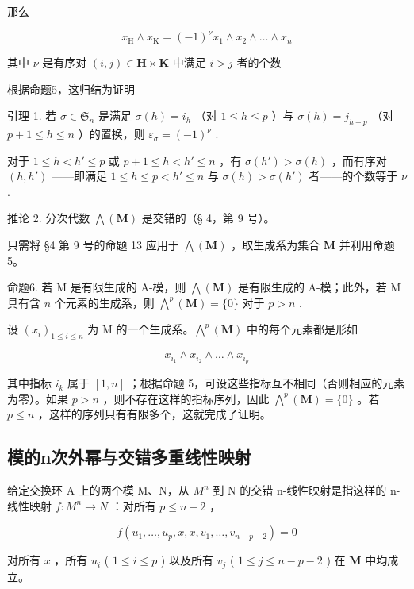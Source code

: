 那么

\[
x _ {\mathrm{H}} \wedge x _ {\mathrm{K}} = (- 1) ^ {\nu} x _ {1} \wedge x _ {2} \wedge \dots \wedge x _ {n}\tag{7}
\]

其中 \(\nu\) 是有序对 \((i,j)\in \mathbf{H}\times \mathbf{K}\) 中满足 \(i > j\) 者的个数

根据命题5，这归结为证明

引理 1. 若 \(\sigma \in \mathfrak{S}_n\) 是满足 \(\sigma(h) = i_h\) （对 \(1 \leqslant h \leqslant p\) ）与 \(\sigma(h) = j_{h-p}\) （对 \(p + 1 \leqslant h \leqslant n\) ）的置换，则 \(\varepsilon_\sigma = (-1)^{\nu}\) .

对于 \(1 \leqslant h < h' \leqslant p\) 或 \(p + 1 \leqslant h < h' \leqslant n\) ，有 \(\sigma(h') > \sigma(h)\) ，而有序对 \((h, h')\) ——即满足 \(1 \leqslant h \leqslant p < h' \leqslant n\) 与 \(\sigma(h) > \sigma(h')\) 者——的个数等于 \(\nu\) .

推论 2. 分次代数 \(\bigwedge (\mathbf{M})\) 是交错的（§ 4，第 9 号）。

只需将 §4 第 9 号的命题 13 应用于 \(\bigwedge (\mathbf{M})\) ，取生成系为集合 \(\mathbf{M}\) 并利用命题5。

命题6. 若 M 是有限生成的 A-模，则 \(\bigwedge (\mathbf{M})\) 是有限生成的 A-模；此外，若 M 具有含 \(n\) 个元素的生成系，则 \(\bigwedge^{p}(\mathbf{M}) = \{0\}\) 对于 \(p > n\) .

设 \((x_{i})_{1\leqslant i\leqslant n}\) 为 M 的一个生成系。\(\bigwedge^{p}(\mathbf{M})\) 中的每个元素都是形如

\[
x _ {i _ {1}} \wedge x _ {i _ {2}} \wedge \dots \wedge x _ {i _ {p}}
\]

其中指标 \(i_k\) 属于 \([1, n]\) ；根据命题 5，可设这些指标互不相同（否则相应的元素为零）。如果 \(p > n\) ，则不存在这样的指标序列，因此 \(\bigwedge^p(\mathbf{M}) = \{0\}\) 。若 \(p \leqslant n\) ，这样的序列只有有限多个，这就完成了证明。

\subsection{模的n次外幂与交错多重线性映射}

给定交换环 A 上的两个模 M、N，从 \(M^{n}\) 到 N 的交错 n-线性映射是指这样的 n-线性映射 \(f: M^{n} \to N\) ：对所有 \(p \leqslant n - 2\) ，

\[
f (u _ {1}, \dots , u _ {p}, x, x, v _ {1}, \dots , v _ {n - p - 2}) = 0\tag{8}
\]

对所有 \(x\) ，所有 \(u_{i}\) ( \(1 \leqslant i \leqslant p\) ) 以及所有 \(v_{j}\) ( \(1 \leqslant j \leqslant n - p - 2\) ) 在 \(\mathbf{M}\) 中均成立。

